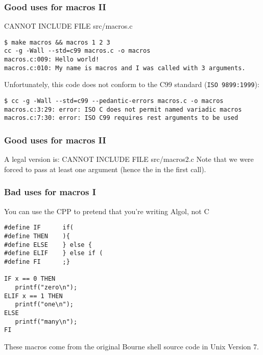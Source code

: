 \documentclass[10pt, t]{beamer}
\begin{document}
\begin{frame}[fragile]
\frametitle{Good uses for macros II}
\label{sec-4_1_4}

CANNOT INCLUDE FILE src/macros.c
\pause
\begin{verbatim}
$ make macros && macros 1 2 3
cc -g -Wall --std=c99 macros.c -o macros
macros.c:009: Hello world!
macros.c:010: My name is macros and I was called with 3 arguments.
\end{verbatim}

\pause
Unfortunately, this code does not conform to the C99 standard (\texttt{ISO 9899:1999}):
\begin{verbatim}
$ cc -g -Wall --std=c99 --pedantic-errors macros.c -o macros
macros.c:3:29: error: ISO C does not permit named variadic macros
macros.c:7:30: error: ISO C99 requires rest arguments to be used
\end{verbatim}
\end{frame}
\begin{frame}
\frametitle{Good uses for macros II}
\label{sec-4_1_5}

A legal version is:
CANNOT INCLUDE FILE src/macros2.c
Note that we were forced to pass at least one argument (hence the  in the first call).
\end{frame}
\begin{frame}[fragile]
\frametitle{Bad uses for macros I}
\label{sec-4_1_6}

You can use the CPP to pretend that you're writing Algol, not C
\begin{verbatim}
#define IF      if(
#define THEN    ){
#define ELSE    } else {
#define ELIF    } else if (
#define FI      ;}

IF x == 0 THEN
   printf("zero\n");
ELIF x == 1 THEN
   printf("one\n");
ELSE
   printf("many\n");
FI
\end{verbatim}
\pause
These macros come from the original Bourne shell source code in Unix Version 7.
\end{frame}
\end{document}
